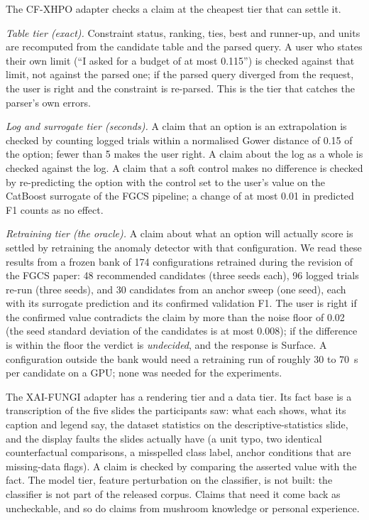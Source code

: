 \documentclass[preprint,12pt,3p,times]{elsarticle}
\begin{document}
The CF-XHPO adapter checks a claim at the cheapest tier that can settle it.

\emph{Table tier (exact).} Constraint status, ranking, ties, best and runner-up, and units are recomputed from the candidate table and the parsed query. A user who states their own limit (``I asked for a budget of at most 0.115'') is checked against that limit, not against the parsed one; if the parsed query diverged from the request, the user is right and the constraint is re-parsed. This is the tier that catches the parser's own errors.

\emph{Log and surrogate tier (seconds).} A claim that an option is an extrapolation is checked by counting logged trials within a normalised Gower distance of 0.15 of the option; fewer than 5 makes the user right. A claim about the log as a whole is checked against the log. A claim that a soft control makes no difference is checked by re-predicting the option with the control set to the user's value on the CatBoost surrogate of the FGCS pipeline; a change of at most 0.01 in predicted F1 counts as no effect.

\emph{Retraining tier (the oracle).} A claim about what an option will actually score is settled by retraining the anomaly detector with that configuration. We read these results from a frozen bank of 174 configurations retrained during the revision of the FGCS paper: 48 recommended candidates (three seeds each), 96 logged trials re-run (three seeds), and 30 candidates from an anchor sweep (one seed), each with its surrogate prediction and its confirmed validation F1. The user is right if the confirmed value contradicts the claim by more than the noise floor of 0.02 (the seed standard deviation of the candidates is at most 0.008); if the difference is within the floor the verdict is \emph{undecided}, and the response is Surface. A configuration outside the bank would need a retraining run of roughly 30 to 70~s per candidate on a GPU; none was needed for the experiments.

The XAI-FUNGI adapter has a rendering tier and a data tier. Its fact base is a transcription of the five slides the participants saw: what each shows, what its caption and legend say, the dataset statistics on the descriptive-statistics slide, and the display faults the slides actually have (a unit typo, two identical counterfactual comparisons, a misspelled class label, anchor conditions that are missing-data flags). A claim is checked by comparing the asserted value with the fact. The model tier, feature perturbation on the classifier, is not built: the classifier is not part of the released corpus. Claims that need it come back as uncheckable, and so do claims from mushroom knowledge or personal experience.
\end{document}

